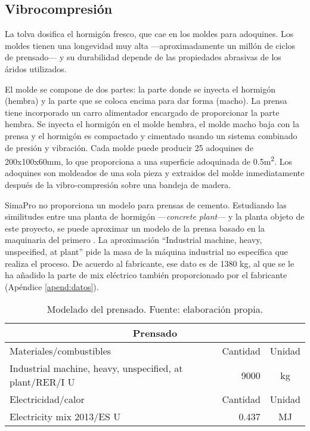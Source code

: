 \subsection{Vibrocompresión}

La tolva dosifica el hormigón fresco, que cae en los moldes para adoquines. Los moldes tienen una longevidad muy alta —aproximadamente un millón de ciclos de prensado— y su durabilidad depende de las propiedades abrasivas de los áridos utilizados.

El molde se compone de dos partes: la parte donde se inyecta el hormigón (hembra) y la parte que se coloca encima para dar forma (macho). La prensa tiene incorporado un carro alimentador encargado de proporcionar la parte hembra. Se inyecta el hormigón en el molde hembra, el molde macho baja con la prensa y el hormigón es compactado y cimentado usando un sistema combinado de presión y vibración. Cada molde puede producir 25 adoquines de 200x100x60\si{\milli\meter}, lo que proporciona a una superficie adoquinada de 0.5\si{\square\meter}. Los adoquines son moldeados de una sola pieza y extraidos del molde inmediatamente después de la vibro-compresión sobre una bandeja de madera.

SimaPro no proporciona un modelo para prensas de cemento. Estudiando las similitudes entre una planta de hormigón —\textit{concrete plant}— y la planta objeto de este proyecto, se puede aproximar un modelo de la prensa basado en la maquinaria del primero \cite{buildingproducts}. La aproximación ``Industrial machine, heavy, unspecified, at plant'' pide la masa de la máquina industrial no específica que realiza el proceso. De acuerdo al fabricante, ese dato es de 1380 \si{kg}, al que se le ha añadido la parte de mix eléctrico también proporcionado por el fabricante (Apéndice \ref{apend:datos}).

\begin{table}[!htb]
\centering
\begin{tabular}{p{8cm}rc}
\toprule
\multicolumn{3}{c}{Prensado}\\
\midrule
Materiales/combustibles & Cantidad & Unidad\\
\midrule
Industrial machine, heavy, unspecified, at plant/RER/I U & 9000 & \si{kg}\\
\midrule
Electricidad/calor & Cantidad & Unidad\\
\midrule
Electricity mix 2013/ES U & 0.437 & \si{MJ}\\
\bottomrule
\end{tabular}
\caption[Modelado del prensado.]{Modelado del prensado. Fuente: elaboración propia.}
\label{modeladoprensado}
\end{table}

